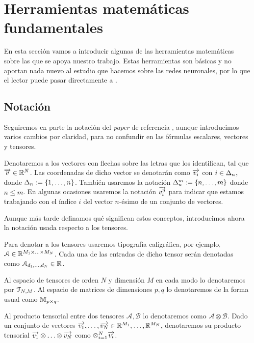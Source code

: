 
\chapter{Herramientas matemáticas fundamentales} \label{ch:matematicas_fundamentales}

En esta sección vamos a introducir algunas de las herramientas matemáticas sobre las que se apoya nuestro trabajo. Estas herramientas son básicas y no aportan nada nuevo al estudio que hacemos sobre las redes neuronales, por lo que el lector puede pasar directamente a .

\section{Notación}

Seguiremos en parte la notación del \textit{paper} de referencia \cite{matematicas:principal}, aunque introducimos varios cambios por claridad, para no confundir en las fórmulas escalares, vectores y tensores.

Denotaremos a los vectores con flechas sobre las letras que los identifican, tal que $\overrightarrow{v} \in \mathbb{R}^N$. Las coordenadas de dicho vector se denotarán como $\overrightarrow{v_i}$ con $i \in \Delta_{n}$, donde $\Delta_{n} := \{1, \ldots, n\}$. También usaremos la notación $\Delta_{n}^{m} := \{n, \ldots, m\}$ donde $n \leq m$. En algunas ocasiones usaremos la notación $\overrightarrow{v_i^n}$ para indicar que estamos trabajando con el índice $i$ del vector $n$-ésimo de un conjunto de vectores.

Aunque más tarde definamos qué significan estos conceptos, introducimos ahora la notación usada respecto a los tensores.

Para denotar a los tensores usaremos tipografía caligráfica, por ejemplo, $\mathcal{A} \in \mathbb{R}^{M_1 \times \ldots \times M_N}$. Cada una de las entradas de dicho tensor serán denotadas como $\mathcal{A}_{d_1, \ldots, d_N} \in \mathbb{R}$.

Al espacio de tensores de orden $N$ y dimensión $M$ en cada modo lo denotaremos por $\mathcal{T}_{N, M}$. Al espacio de matrices de dimensiones $p, q$ lo denotaremos de la forma usual como  $\mathbb{M}_{p \times q}$.

Al producto tensorial entre dos tensores $\mathcal{A}, \mathcal{B}$ lo denotaremos como $\mathcal{A} \otimes \mathcal{B}$. Dado un conjunto de vectores $\overrightarrow{v_1}, \ldots, \overrightarrow{v_N} \in \mathbb{R}^{M_1}, \ldots, \mathbb{R}^{M_N}$, denotaremos su producto tensorial $\overrightarrow{v_1} \otimes \ldots \otimes \overrightarrow{v_N}$ como $\otimes_{i = 1}^N \overrightarrow{v_i}$.

